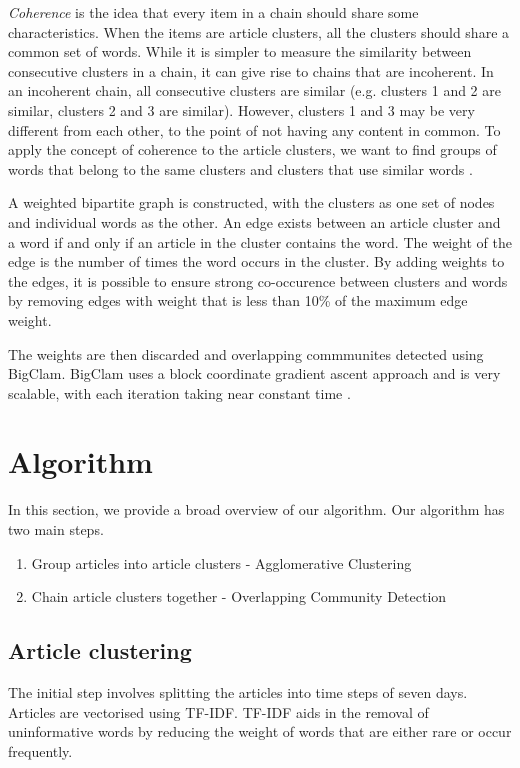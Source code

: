 \documentclass[12pt]{article}
\begin{document}
\textit{Coherence} is the idea that every item in a chain should share some characteristics. When the items are article clusters, all the clusters should share a common set of words. While it is simpler to measure the similarity between consecutive clusters in a chain, it can give rise to chains that are incoherent. In an incoherent chain, all consecutive clusters are similar (e.g. clusters 1 and 2 are similar, clusters 2 and 3 are similar). However, clusters 1 and 3 may be very different from each other, to the point of not having any content in common. To apply the concept of coherence to the article clusters, we want to find groups of words that belong to the same clusters and clusters that use similar words \cite{infocartography}.

A weighted bipartite graph is constructed, with the clusters as one set of nodes and individual words as the other. An edge exists between an article cluster and a word if and only if an article in the cluster contains the word. The weight of the edge is the number of times the word occurs in the cluster. By adding weights to the edges, it is possible to ensure strong co-occurence between clusters and words by removing edges with weight that is less than 10\% of the maximum edge weight. 

The weights are then discarded and overlapping commmunites detected using BigClam. BigClam uses a block coordinate gradient ascent approach and is very scalable, with each iteration taking near constant time \cite{overlapcom}.


\section{Algorithm}
In this section, we provide a broad overview of our algorithm. Our algorithm has two main steps.
\begin{enumerate}[noitemsep]
\item{Group articles into article clusters - Agglomerative Clustering}
\item{Chain article clusters together - Overlapping Community Detection}
\end{enumerate}
\subsection{Article clustering} \label{articlecluster}
The initial step involves splitting the articles into time steps of seven days. Articles are vectorised using TF-IDF. TF-IDF aids in the removal of uninformative words by reducing the weight of words that are either rare or occur frequently. 
\end{document}
